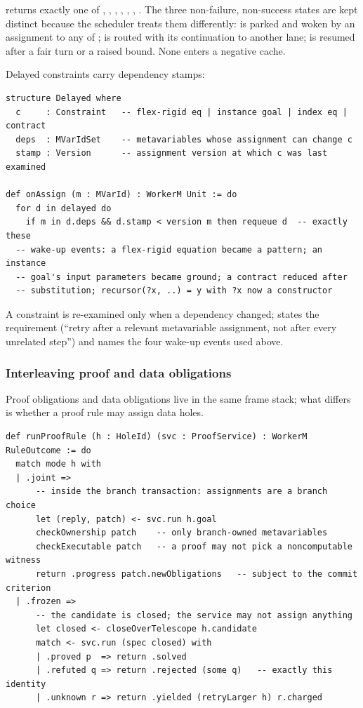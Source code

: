  returns exactly one of , , , , , , . The three non-failure, non-success states are kept distinct because the scheduler treats them differently:  is parked and woken by an assignment to any of ;  is routed with its continuation  to another lane;  is resumed after a fair turn or a raised bound. None enters a negative cache.

Delayed constraints carry dependency stamps:

\begin{lstlisting}
structure Delayed where
  c     : Constraint   -- flex-rigid eq | instance goal | index eq | contract
  deps  : MVarIdSet    -- metavariables whose assignment can change c
  stamp : Version      -- assignment version at which c was last examined

def onAssign (m : MVarId) : WorkerM Unit := do
  for d in delayed do
    if m in d.deps && d.stamp < version m then requeue d  -- exactly these
  -- wake-up events: a flex-rigid equation became a pattern; an instance
  -- goal's input parameters became ground; a contract reduced after
  -- substitution; recursor(?x, ..) = y with ?x now a constructor
\end{lstlisting}

A constraint is re-examined only when a dependency changed;  states the requirement (``retry after a relevant metavariable assignment, not after every unrelated step'') and  names the four wake-up events used above.

\subsubsection{Interleaving proof and data obligations}\label{alg:interleave}

Proof obligations and data obligations live in the same frame stack; what differs is whether a proof rule may assign data holes.

\begin{lstlisting}
def runProofRule (h : HoleId) (svc : ProofService) : WorkerM RuleOutcome := do
  match mode h with
  | .joint =>
      -- inside the branch transaction: assignments are a branch choice
      let (reply, patch) <- svc.run h.goal
      checkOwnership patch    -- only branch-owned metavariables
      checkExecutable patch   -- a proof may not pick a noncomputable witness
      return .progress patch.newObligations   -- subject to the commit criterion
  | .frozen =>
      -- the candidate is closed; the service may not assign anything
      let closed <- closeOverTelescope h.candidate
      match <- svc.run (spec closed) with
      | .proved p  => return .solved
      | .refuted q => return .rejected (some q)   -- exactly this identity
      | .unknown r => return .yielded (retryLarger h) r.charged
\end{lstlisting}

